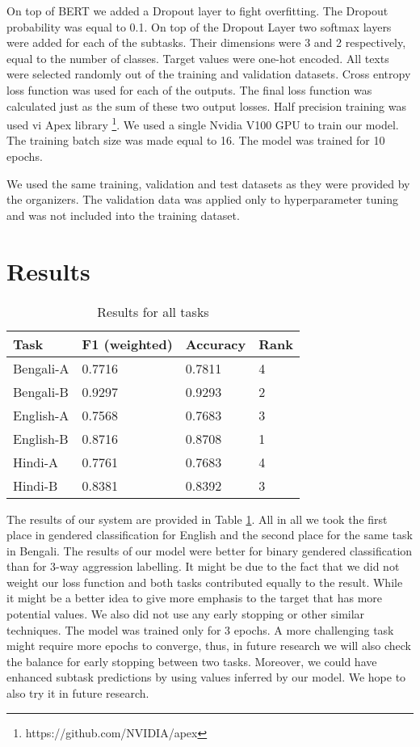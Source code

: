 \documentclass[10pt, a4paper]{article}
\begin{document}
On top of BERT we added a Dropout layer to fight overfitting. The Dropout probability was equal to 0.1. On top of the Dropout Layer two softmax layers were added for each of the subtasks. Their dimensions were 3 and 2 respectively, equal to the number of classes. Target values were one-hot encoded. All texts were selected randomly out of the training and validation datasets. Cross entropy loss function was used for each of the outputs. The final loss function was calculated just as the sum of these two output losses.
Half precision training was used vi Apex library \footnote{https://github.com/NVIDIA/apex}. We used a single Nvidia V100 GPU to train our model. The training batch size was made equal to 16. The model was trained for 10 epochs.

We used the same training, validation and test datasets as they were provided by the organizers. The validation data was applied only to hyperparameter tuning and was not included into the training dataset.


\section{Results}
\label{sec:results}

\begin{table}[h]
\begin{tabular}{|llll|}
\hline
\bf Task & \bf F1 (weighted) & \bf Accuracy & \bf Rank\\ 
\hline
\hline
Bengali-A & 0.7716 & 0.7811 & 4\\  \hline
Bengali-B & 0.9297 & 0.9293 & 2\\  \hline
English-A & 0.7568 & 0.7683 & 3\\ \hline
English-B & 0.8716 & 0.8708 & 1\\ \hline
Hindi-A & 0.7761 & 0.7683 & 4\\  \hline
Hindi-B & 0.8381 & 0.8392 & 3\\  \hline
\end{tabular}
\caption{Results for all tasks}
\label{tab:results}
\end{table}

The results of our system are provided in Table \ref{tab:results}. All in all we took the first place in gendered classification for English and the second place for the same task in Bengali. The results of our model were better for binary gendered classification than for 3-way aggression labelling. It might be due to the fact that we did not weight our loss function and both tasks contributed equally to the result. While it might be a better idea to give more emphasis to the target that has more potential values. We also did not use any early stopping or other similar techniques. The model was trained only for 3 epochs. A more challenging task might require more epochs to converge, thus, in future research we will also check the balance for early stopping between two tasks. Moreover, we could have enhanced subtask predictions by using values inferred by our model. We hope to also try it in future research.
\end{document}
